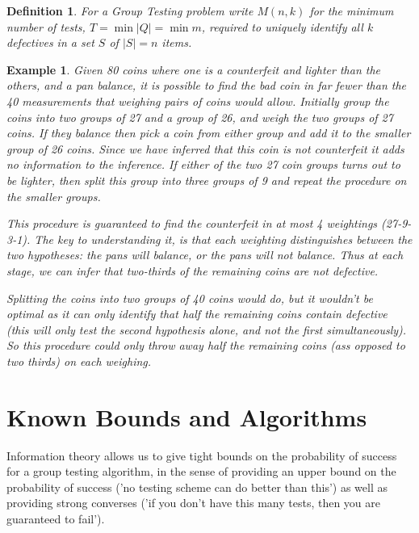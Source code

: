\documentclass{article}
\newtheorem{example}{Example}[section]
\newtheorem{definition}{Definition}[section]
\begin{document}
\begin{definition}
For a Group Testing problem write \( M\left(n,k\right) \) for the minimum number of tests, \(T = \min{\lvert Q \rvert}  = \min{m}\), required to uniquely identify all \(k\) defectives in a set \(S\) of \(\lvert S \rvert = n \) items.
\end{definition}

\begin{example}
Given 80 coins where one is a counterfeit and lighter than the others, and a pan balance, it is possible to find the bad coin in far fewer than the 40 measurements that weighing pairs of coins would allow. Initially group the coins into two groups of 27 and a group of 26, and weigh the two groups of 27 coins. If they balance then pick a coin from  either group and add it to the smaller group of 26 coins. Since we have inferred that this coin is not counterfeit it adds no information to the inference. If either of the two 27 coin groups turns out to be lighter, then split this group into three groups of 9 and repeat the procedure on the smaller groups. 

This procedure is guaranteed to find the counterfeit in at most 4 weightings (27-9-3-1). The key to understanding it, is that each weighting distinguishes between the two hypotheses: the pans will balance, or the pans will not balance. Thus at each stage, we can infer that two-thirds of the remaining coins are not defective. 

Splitting the coins into two groups of 40 coins would do, but it wouldn't be optimal as it can only identify that half the remaining coins contain defective (this will only test the second hypothesis alone, and not the first simultaneously). So this procedure could only throw away half the remaining coins (ass opposed to two thirds) on each weighing.
\end{example}


\section{Known Bounds and Algorithms}
Information theory allows us to give tight bounds on the probability of success for a group testing algorithm, in the sense of providing an upper bound on the probability of success ('no testing scheme can do better than this') as well as providing strong converses ('if you don't have this many tests, then you are guaranteed to fail').
\end{document}
